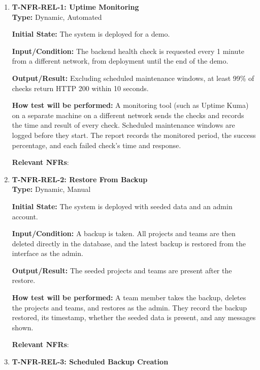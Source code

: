 \documentclass[12pt, titlepage]{article}
\providecommand{\descriptiveid}[1]{\texttt{\detokenize{#1}}}
\providecommand{\nfrref}[1]{\descriptiveid{#1}}
\newcommand{\uptimePercent}{99\%}
\newcommand{\healthCheckInterval}{1 minute}
\newcommand{\healthCheckTimeout}{10 seconds}
\begin{document}
\begin{enumerate}

\item \label{T-NFR-REL-1}\textbf{T-NFR-REL-1: Uptime Monitoring}\\

\textbf{Type:} Dynamic, Automated

\textbf{Initial State:} The system is deployed for a demo.

\textbf{Input/Condition:} The backend health check is requested every
\healthCheckInterval{} from a different network, from deployment until the end of the demo.

\textbf{Output/Result:} Excluding scheduled maintenance windows, at least
\uptimePercent{} of checks return HTTP 200 within \healthCheckTimeout{}.

\textbf{How test will be performed:} A monitoring tool (such as Uptime Kuma) on
a separate machine on a different network sends the checks and records the
time and result of every check. Scheduled maintenance windows are logged before
they start. The report records the monitored period, the success percentage,
and each failed check's time and response.

\textbf{Relevant NFRs}: \nfrref{NFR_Uptime}

\item \label{T-NFR-REL-2}\textbf{T-NFR-REL-2: Restore From Backup}\\

\textbf{Type:} Dynamic, Manual

\textbf{Initial State:} The system is deployed with seeded data and an admin
account.

\textbf{Input/Condition:} A backup is taken. All projects and teams are then
deleted directly in the database, and the latest backup is restored from the
interface as the admin.

\textbf{Output/Result:} The seeded projects and teams
are present after the restore.

\textbf{How test will be performed:} A team member takes the backup, deletes
the projects and teams, and restores as the admin. They record the backup
restored, its timestamp, whether the seeded data is present, and any messages
shown.

\textbf{Relevant NFRs}: \nfrref{NFR_Recoverable}

\item \label{T-NFR-REL-3}\textbf{T-NFR-REL-3: Scheduled Backup Creation}\\


\end{enumerate}
\end{document}
